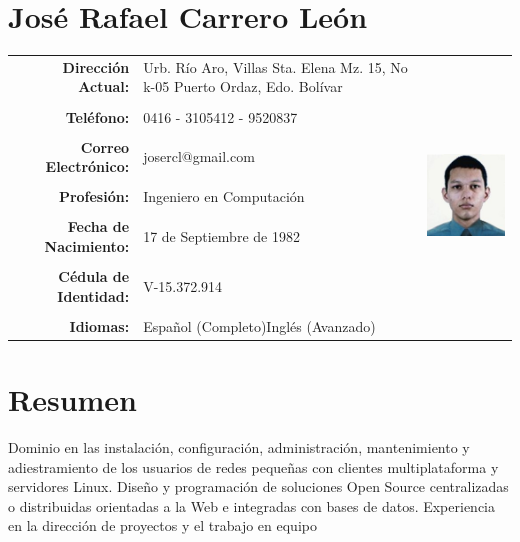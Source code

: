 \documentclass[letterpaper,11pt]{report}
\begin{document}
\section*{José Rafael Carrero León}

\begin{tabular}{r p{2.4in} p{46mm}}
\textbf{Dirección Actual:}&Urb. Río Aro, Villas Sta. Elena\newline
Mz. 15, No k-05 \newline
Puerto Ordaz, Edo. Bolívar & \multirow{13}{*}{\includegraphics[scale=.8]{foto_curriculum}}\\
 & & \\
\textbf{Teléfono:}&0416 - 3105412\newline 0286 - 9520837&\\
 & & \\
\textbf{Correo Electrónico:}&josercl@gmail.com&\\
 & & \\
\textbf{Profesión:}&Ingeniero en Computación&\\
 & & \\
\textbf{Fecha de Nacimiento:}&17 de Septiembre de 1982&\\
 & & \\
\textbf{Cédula de Identidad:}&V-15.372.914&\\
 & & \\
\textbf{Idiomas:}&Espa\~{n}ol (Completo)\newline Inglés (Avanzado)&\\
\end{tabular}


\section*{Resumen}
Dominio en las instalación, configuración, administración, mantenimiento y adiestramiento de los usuarios de redes peque\~{n}as con clientes multiplataforma y servidores Linux. Dise\~{n}o y programación de soluciones Open Source centralizadas o distribuidas orientadas a la Web e integradas con bases de datos. Experiencia en la dirección de proyectos y el trabajo en equipo
\end{document}

